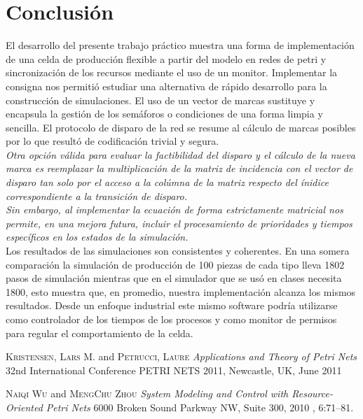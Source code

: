 \documentclass[12pt]{article} %
\begin{document}
\section{Conclusión} %
El desarrollo del presente trabajo práctico muestra una forma de implementación de una celda de producción flexible a partir del modelo en redes de petri y sincronización de los recursos mediante el uso de un monitor.
Implementar la consigna nos permitió estudiar una alternativa de rápido desarrollo para la construcción de simulaciones.
El uso de un vector de marcas sustituye y encapsula la gestión de los semáforos o condiciones de una forma limpia y sencilla.
El protocolo de disparo de la red se resume al cálculo de marcas posibles por lo que resultó de codificación trivial y segura.\\
\emph{Otra opción válida para evaluar la factibilidad del disparo y el cálculo de la nueva marca es reemplazar la multiplicación de la matriz de incidencia  con el vector de disparo tan solo por el acceso a la colúmna de la matriz respecto del ínidice correspondiente a la transición de disparo.\\
Sin embargo, al implementar la ecuación de forma estrictamente matricial nos permite, en una mejora futura, incluir el procesamiento de prioridades y tiempos específicos en los estados de la simulación.\\}
Los resultados de las simulaciones son consistentes y coherentes. En una somera comparación la simulación de producción de 100 piezas de cada tipo lleva 1802 pasos de simulación mientras que en el simulador que se usó en clases necesita 1800, esto muestra que, en promedio, nuestra implementación alcanza los mismos resultados.
Desde un enfoque industrial este mismo software podría utilizarse como controlador de los tiempos de los procesos y como monitor de permisos para regular el comportamiento de la celda.


\begin{thebibliography}{99} %

 \textsc{Kristensen, Lars M.} and \textsc{Petrucci, Laure}
\textit{Applications and Theory of Petri Nets}
32nd International Conference PETRI NETS 2011, Newcastle, UK, June 2011

 \textsc{Naiqi Wu} and \textsc{MengChu Zhou}
\textit{System Modeling
and Control with
Resource-Oriented
Petri Nets}
6000 Broken Sound Parkway NW, Suite 300, 2010
, 6:71--81.



\end{thebibliography}

\end{document}
